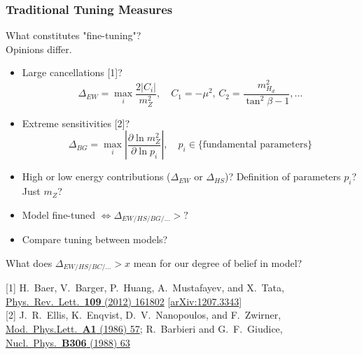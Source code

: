 \documentclass[10pt,aspectratio=169]{beamer}
\begin{document}
\begin{frame}
  \frametitle{Traditional Tuning Measures}
  \begin{center}
    What constitutes "fine-tuning"? \\
    Opinions differ.
  \end{center}
  \begin{itemize} \itemsep0.8em
    \item Large cancellations [1]?
      \begin{equation*}
        \Delta_{EW} = \max_i \frac{2|C_i|}{m_Z^2}, \quad C_1 = -\mu^2, \,
        C_2 = \frac{m_{H_d}^2}{\tan^2\beta - 1}, \ldots
      \end{equation*}
    \item Extreme sensitivities [2]?
      \begin{equation*}
        \Delta_{BG} = \max_i \left | \frac{\partial \ln m_Z^2}
        {\partial \ln p_i} \right | , \quad p_i \in \{\text{fundamental
        parameters}\}
      \end{equation*}
    \item High or low energy contributions ($\Delta_{EW}$ or $\Delta_{HS}$)?
      Definition of parameters $p_i$? Just $m_Z$?
    \item Model fine-tuned $\Leftrightarrow \Delta_{EW/HS/BG/\ldots} > ?$
    \item Compare tuning between models?
  \end{itemize}
  \begin{center}
  \alert{What does $\Delta_{EW/HS/BC/\ldots} > x$ mean for our degree of belief
    in model?}
  \end{center}
      { \tiny
        [1] H.~Baer, V.~Barger, P.~Huang, A.~Mustafayev, and X.~Tata,
        \href{https://doi.org/10.1103/PhysRevLett.109.161802}{%
          Phys.~Rev.~Lett.~\textbf{109} (2012) 161802}
             [\href{http://arxiv.org/abs/1207.3343}{arXiv:1207.3343}] \\[-5pt]
        [2] J.~R.~Ellis, K.~Enqvist, D.~V.~Nanopoulos, and F.~Zwirner,
        \href{https://doi.org/10.1142/S0217732386000105}{%
          Mod.~Phys.Lett.~\textbf{A1} (1986) 57};
          R.~Barbieri and G.~F.~Giudice,
          \href{https://doi.org/10.1016/0550-3213(88)90171-X}{%
            Nucl.~Phys.~\textbf{B306} (1988) 63}
      }
\end{frame}
\end{document}
